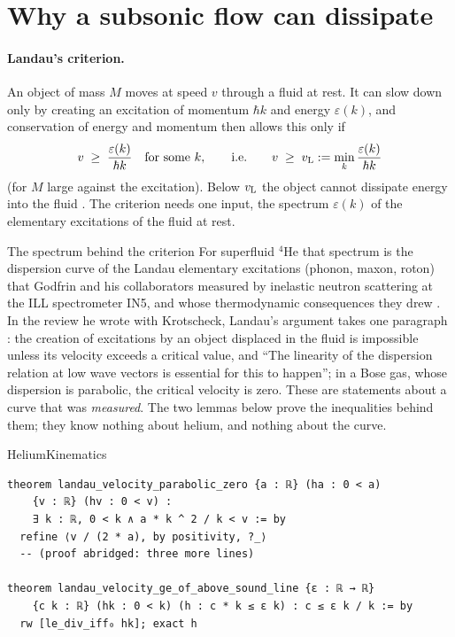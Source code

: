 \section{Why a subsonic flow can dissipate}\label{ch09:landau}

\paragraph{Landau's criterion.} An object of mass $M$ moves at speed $v$ through a fluid at rest. It can slow down only by creating an excitation of momentum $\hbar k$ and energy $\varepsilon(k)$, and conservation of energy and momentum then allows this only if
\begin{equation}\label{ch09:eq-landau}
v\;\ge\;\frac{\varepsilon(k)}{\hbar k}\quad\text{for some }k,\qquad\text{i.e.}\qquad v\;\ge\;v_{\rm L}:=\min_k\frac{\varepsilon(k)}{\hbar k}
\end{equation}
(for $M$ large against the excitation). Below $v_{\rm L}$ the object cannot dissipate energy into the fluid \cite{Landau1941}. The criterion needs one input, the spectrum $\varepsilon(k)$ of the elementary excitations of the fluid at rest.

\begin{godfrinbox}{The spectrum behind the criterion}
For superfluid $^4$He that spectrum is the dispersion curve of the Landau elementary excitations (phonon, maxon, roton) that Godfrin and his collaborators measured by inelastic neutron scattering at the ILL spectrometer IN5, and whose thermodynamic consequences they drew \cite{Godfrin2021}. In the review he wrote with Krotscheck, Landau's argument takes one paragraph \cite{GodfrinKrotscheck2022}: the creation of excitations by an object displaced in the fluid is impossible unless its velocity exceeds a critical value, and ``The linearity of the dispersion relation at low wave vectors is essential for this to happen''; in a Bose gas, whose dispersion is parabolic, the critical velocity is zero. These are statements about a curve that was \emph{measured}. The two lemmas below prove the inequalities behind them; they know nothing about helium, and nothing about the curve.
\end{godfrinbox}

\begin{leanbox}{HeliumKinematics}
\begin{lstlisting}[style=lean]
theorem landau_velocity_parabolic_zero {a : ℝ} (ha : 0 < a)
    {v : ℝ} (hv : 0 < v) :
    ∃ k : ℝ, 0 < k ∧ a * k ^ 2 / k < v := by
  refine ⟨v / (2 * a), by positivity, ?_⟩
  -- (proof abridged: three more lines)

theorem landau_velocity_ge_of_above_sound_line {ε : ℝ → ℝ}
    {c k : ℝ} (hk : 0 < k) (h : c * k ≤ ε k) : c ≤ ε k / k := by
  rw [le_div_iff₀ hk]; exact h
\end{lstlisting}
\end{leanbox}

